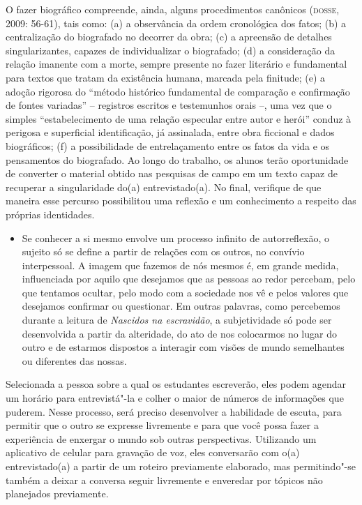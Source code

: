 \documentclass[12pt]{extarticle}
\begin{document}
O fazer biográfico compreende, ainda, alguns procedimentos canônicos
(\textsc{dosse}, 2009: 56-61), tais como: (a) a observância da ordem cronológica
dos fatos; (b) a centralização do biografado no decorrer da obra; (c) a
apreensão de detalhes singularizantes, capazes de individualizar o
biografado; (d) a consideração da relação imanente com a morte, sempre
presente no fazer literário e fundamental para textos que tratam da
existência humana, marcada pela finitude; (e) a adoção rigorosa do
``método histórico fundamental de comparação e confirmação de fontes
variadas'' -- registros escritos e testemunhos orais --, uma vez que o
simples ``estabelecimento de uma relação especular entre autor e herói''
conduz à perigosa e superficial identificação, já assinalada, entre obra
ficcional e dados biográficos; (f) a possibilidade de entrelaçamento
entre os fatos da vida e os pensamentos do biografado. Ao longo do
trabalho, os alunos terão oportunidade de converter o material obtido
nas pesquisas de campo em um texto capaz de recuperar a singularidade
do(a) entrevistado(a). No final, verifique de que maneira esse percurso
possibilitou uma reflexão e um conhecimento a respeito das próprias
identidades.

\begin{itemize}
\item
  Se conhecer a si mesmo envolve um processo infinito de autorreflexão,
  o sujeito só se define a partir de relações com os outros, no convívio
  interpessoal. A imagem que fazemos de nós mesmos é, em grande medida,
  influenciada por aquilo que desejamos que as pessoas ao redor
  percebam, pelo que tentamos ocultar, pelo modo com a sociedade nos vê
  e pelos valores que desejamos confirmar ou questionar. Em outras
  palavras, como percebemos durante a leitura de \emph{Nascidos na
  escravidão}, a subjetividade só pode ser desenvolvida a partir da
  alteridade, do ato de nos colocarmos no lugar do outro e de estarmos
  dispostos a interagir com visões de mundo semelhantes ou diferentes
  das nossas.
\end{itemize}

Selecionada a pessoa sobre a qual os estudantes escreverão, eles podem
agendar um horário para entrevistá"-la e colher o maior de números de
informações que puderem. Nesse processo, será preciso desenvolver a
habilidade de escuta, para permitir que o outro se expresse livremente e
para que você possa fazer a experiência de enxergar o mundo sob outras
perspectivas. Utilizando um aplicativo de celular para gravação de voz,
eles conversarão com o(a) entrevistado(a) a partir de um roteiro
previamente elaborado, mas permitindo"-se também a deixar a conversa
seguir livremente e enveredar por tópicos não planejados previamente.
\end{document}
